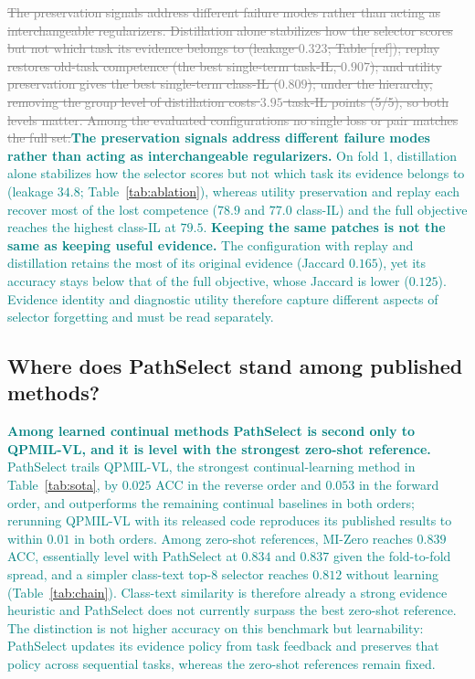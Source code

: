 \documentclass{article}
\newif\ifmarkup \markuptrue
\newcommand{\repc}[3]{\ifmarkup\textcolor{gray}{\sout{#2}}\textcolor{#1}{#3}\else#3\fi}
\newcommand{\repG}[2]{\repc{teal}{#1}{#2}}    %
\begin{document}
\repG{The preservation signals address different failure modes rather than acting as interchangeable regularizers. Distillation alone stabilizes how the selector scores but not which task its evidence belongs to (leakage $0.323$; Table [ref]); replay restores old-task competence (the best single-term task-IL, $0.907$); and utility preservation gives the best single-term class-IL ($0.809$); under the hierarchy, removing the group level of distillation costs $3.95$ task-IL points (5/5), so both levels matter. Among the evaluated configurations no single loss or pair matches the full set.}{\textbf{The preservation signals address different failure modes rather than acting as interchangeable regularizers.} On fold 1, distillation alone stabilizes how the selector scores but not which task its evidence belongs to (leakage $34.8$; Table~\ref{tab:ablation}), whereas utility preservation and replay each recover most of the lost competence ($78.9$ and $77.0$ class-IL) and the full objective reaches the highest class-IL at $79.5$. \textbf{Keeping the same patches is not the same as keeping useful evidence.} The configuration with replay and distillation retains the most of its original evidence (Jaccard $0.165$), yet its accuracy stays below that of the full objective, whose Jaccard is lower ($0.125$). Evidence identity and diagnostic utility therefore capture different aspects of selector forgetting and must be read separately.}

\subsection{Where does PathSelect stand among published methods?}
\label{ssec:sota}

\repG{}{\textbf{Among learned continual methods PathSelect is second only to QPMIL-VL, and it is level with the strongest zero-shot reference.} PathSelect trails QPMIL-VL, the strongest continual-learning method in Table~\ref{tab:sota}, by $0.025$ ACC in the reverse order and $0.053$ in the forward order, and outperforms the remaining continual baselines in both orders; rerunning QPMIL-VL with its released code reproduces its published results to within $0.01$ in both orders. Among zero-shot references, MI-Zero reaches $0.839$ ACC, essentially level with PathSelect at $0.834$ and $0.837$ given the fold-to-fold spread, and a simpler class-text top-8 selector reaches $0.812$ without learning (Table~\ref{tab:chain}). Class-text similarity is therefore already a strong evidence heuristic and PathSelect does not currently surpass the best zero-shot reference. The distinction is not higher accuracy on this benchmark but learnability: PathSelect updates its evidence policy from task feedback and preserves that policy across sequential tasks, whereas the zero-shot references remain fixed.}
\end{document}
